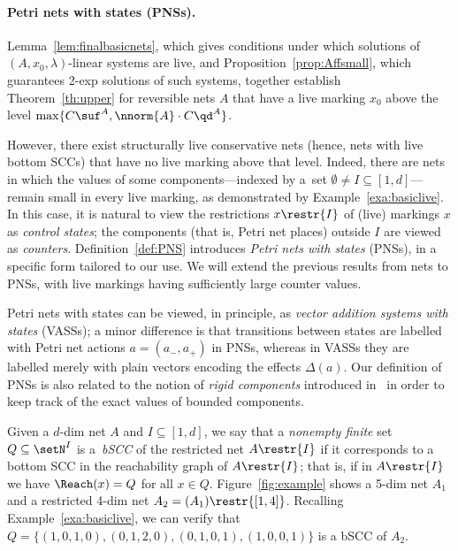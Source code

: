\paragraph{Petri nets with states (PNSs).}
Lemma~\ref{lem:finalbasicnets}, which gives conditions under which 
solutions of $(A,x_0,\lambda)$-linear systems are live,
and Proposition~\ref{prop:Affsmall}, which guarantees 2-exp solutions of 
such systems, together establish Theorem~\ref{th:upper} 
for reversible nets $A$ that have a live marking $x_0$ above the
level $\max\{C\suf^A, \nnorm{A}\cdot C\qd^A\}$.

However, there exist structurally live conservative nets 
(hence, nets with live bottom SCCs)
that have no live marking above that level.
Indeed, there are nets in which the values of some 
components---indexed by a~set $\emptyset\neq I\subseteq[1,d]$---remain
small in every live marking, as demonstrated
by Example~\ref{exa:basiclive}.
In this case, it is natural to view the restrictions $x\restr{I}$ of
(live) markings $x$ as \emph{control states}; the components (that is,
Petri net places) outside $I$ are viewed as \emph{counters}.
Definition~\ref{def:PNS}
introduces \emph{Petri nets with
states} (PNSs), in a specific form tailored to our use.   
We will extend the previous results from nets to PNSs, with live
markings having sufficiently large counter values.

\begin{rem}
Petri nets with states can be viewed, in principle, 
as \emph{vector addition
	systems with states} (VASSs); a minor difference is 
	that transitions between states are
labelled with Petri net actions $a=(a_-,a_+)$ in PNSs, whereas in
	VASSs they are
	labelled merely with 
plain vectors encoding the effects $\Delta(a)$. 
	Our
	definition of PNSs is also related to the notion of
	\emph{rigid components} introduced in~\cite{DBLP:conf/stoc/Kosaraju82} in order to keep track 
	of the exact values of 
bounded components.
\end{rem}

\noindent
Given a $d$-dim net $A$ and $I\subseteq[1,d]$,
we say that a \emph{nonempty finite} set $Q\subseteq\setN^I$ is
a~\emph{bSCC} of the restricted net $A\restr{I}$
if it corresponds to a bottom SCC 
in the
reachability graph of $A\restr{I}$; that is, if in $A\restr{I}$ we have 
$\Reach(x)=Q$ for all $x\in Q$.
Figure~\ref{fig:example} shows a 5-dim net $A_1$ and a restricted 4-dim
 net
$A_2=(A_1)\restr{[1,4]}$. Recalling Example~\ref{exa:basiclive}, we
can verify that $Q=\{(1,0,1,0),(0,1,2,0),(0,1,0,1),(1,0,0,1)\}$ is a
bSCC of $A_2$.

